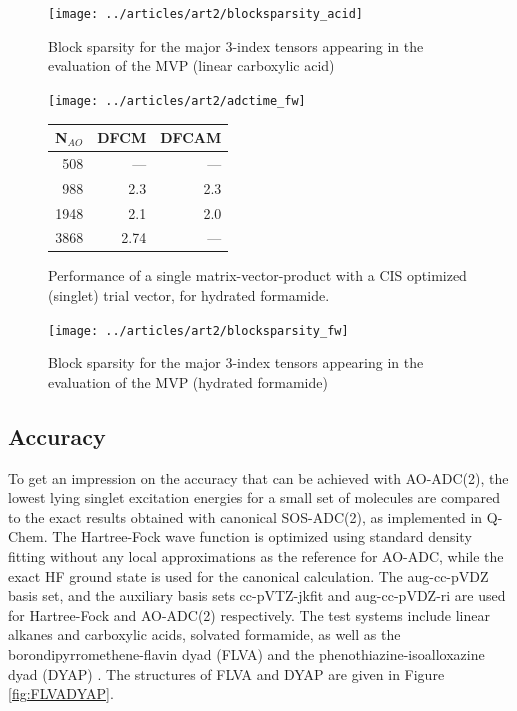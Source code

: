 \begin{figure}
\centering
\texttt{[image: ../articles/art2/blocksparsity\_acid]}
\caption{Block sparsity for the major 3-index tensors appearing in the evaluation of the MVP (linear carboxylic acid)}
\label{fig:ES_SPARSITY_LCA}
\end{figure}

\begin{figure}
\begin{minipage}{0.5\textwidth}
\centering
\texttt{[image: ../articles/art2/adctime\_fw]}
\end{minipage}
\begin{minipage}{0.4\textwidth}
\centering
\begin{tabular}{rrr}
\hline
N$_{AO}$ & DFCM & DFCAM \\ \hline
508	& ---	& --- \\
988	& 2.3	& 2.3 \\
1948 & 	2.1 &	2.0 \\
3868	 & 2.74 & --- \\
 \hline
\end{tabular}
\end{minipage}
\caption{Performance of a single matrix-vector-product with a CIS optimized (singlet) trial vector, for hydrated formamide.}
\label{fig:ES_TIME_FW}
\end{figure}

\begin{figure}
\centering
\texttt{[image: ../articles/art2/blocksparsity\_fw]}
\caption{Block sparsity for the major 3-index tensors appearing in the evaluation of the MVP (hydrated formamide)}
\label{fig:ES_SPARSITY_FW}
\end{figure}

\subsection{Accuracy}

To get an impression on the accuracy that can be achieved with AO-ADC(2), the lowest lying singlet excitation energies for a small set of molecules are compared to the exact results obtained with canonical SOS-ADC(2), as implemented in Q-Chem. The Hartree-Fock wave function is optimized using standard density fitting without any local approximations as the reference for AO-ADC, while the exact HF ground state is used for the canonical calculation. The aug-cc-pVDZ basis set, and the auxiliary basis sets cc-pVTZ-jkfit and aug-cc-pVDZ-ri are used for Hartree-Fock and AO-ADC(2) respectively. The test systems include linear alkanes and carboxylic acids, solvated formamide, as well as the borondipyrromethene-flavin dyad (FLVA) \cite{Kat2007} and the phenothiazine-isoalloxazine dyad (DYAP) \cite{Cra2002}. The structures of FLVA and DYAP are given in Figure \ref{fig:FLVADYAP}.

